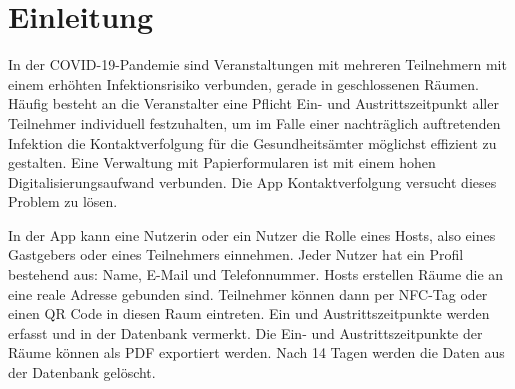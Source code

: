 \sloppy
\section{Einleitung}
\label{sec:Einleitung}
In der COVID-19-Pandemie sind Veranstaltungen mit mehreren Teilnehmern mit einem erhöhten Infektionsrisiko verbunden, gerade in geschlossenen Räumen.
Häufig besteht an die Veranstalter eine Pflicht Ein- und Austrittszeitpunkt aller Teilnehmer individuell festzuhalten, um im Falle einer nachträglich auftretenden Infektion die Kontaktverfolgung für die Gesundheitsämter möglichst effizient zu gestalten.
Eine Verwaltung mit Papierformularen ist mit einem hohen Digitalisierungsaufwand verbunden.
Die App Kontaktverfolgung versucht dieses Problem zu lösen.

In der App kann eine Nutzerin oder ein Nutzer die Rolle eines Hosts, also eines Gastgebers oder eines Teilnehmers einnehmen.
 Jeder Nutzer hat ein Profil bestehend aus: Name, E-Mail und Telefonnummer.
Hosts erstellen Räume die an eine reale Adresse gebunden sind. Teilnehmer können dann per NFC-Tag oder einen QR Code in diesen Raum eintreten. Ein und Austrittszeitpunkte werden erfasst und in der Datenbank vermerkt.
Die Ein- und Austrittszeitpunkte der Räume können als PDF exportiert werden.
Nach 14 Tagen werden die Daten aus der Datenbank gelöscht.
